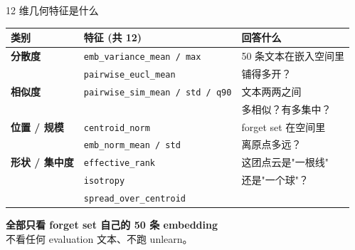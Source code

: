 \documentclass[aspectratio=169,10pt]{beamer}
\begin{document}
\begin{frame}{12 维几何特征是什么}
    \centering
    \footnotesize
    \begin{tabular}{@{}lll@{}}
        \toprule
        类别 & 特征 (共 12) & 回答什么 \\
        \midrule
        \textbf{分散度} & \texttt{emb\_variance\_mean / max}
            & 50 条文本在嵌入空间里\\
        & \texttt{pairwise\_eucl\_mean} & 铺得多开？ \\
        \midrule
        \textbf{相似度} & \texttt{pairwise\_sim\_mean / std / q90}
            & 文本两两之间\\
        & & 多相似？有多集中？ \\
        \midrule
        \textbf{位置 / 规模} & \texttt{centroid\_norm}
            & forget set 在空间里\\
        & \texttt{emb\_norm\_mean / std} & 离原点多远？ \\
        \midrule
        \textbf{形状 / 集中度} & \texttt{effective\_rank}
            & 这团点云是"一根线"\\
        & \texttt{isotropy} & 还是"一个球"？ \\
        & \texttt{spread\_over\_centroid} & \\
        \bottomrule
    \end{tabular}

    \vspace{0.8em}
    \begin{center}
        \normalsize
        \textbf{全部只看 forget set 自己的 50 条 embedding}\\
        不看任何 evaluation 文本、不跑 unlearn。
    \end{center}
\end{frame}
\end{document}

